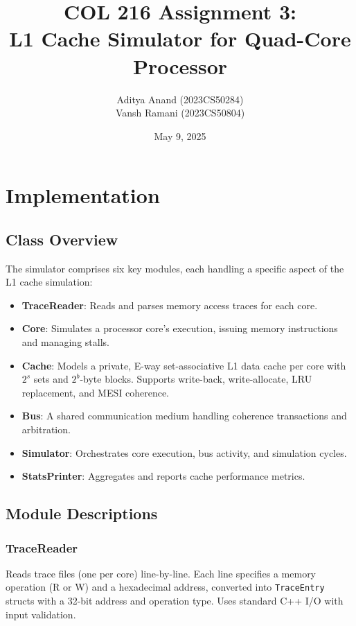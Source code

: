 \documentclass[11pt]{article}
\title{COL 216 Assignment 3: \\ L1 Cache Simulator for Quad-Core Processor}
\author{Aditya Anand (2023CS50284) \\ Vansh Ramani (2023CS50804)}
\date{May 9, 2025}
\begin{document}
\maketitle

\section{Implementation}

\subsection{Class Overview}
The simulator comprises six key modules, each handling a specific aspect of the L1 cache simulation:

\begin{itemize}
    \item \textbf{TraceReader}: Reads and parses memory access traces for each core.
    \item \textbf{Core}: Simulates a processor core’s execution, issuing memory instructions and managing stalls.
    \item \textbf{Cache}: Models a private, E-way set-associative L1 data cache per core with $2^s$ sets and $2^b$-byte blocks. Supports write-back, write-allocate, LRU replacement, and MESI coherence.
    \item \textbf{Bus}: A shared communication medium handling coherence transactions and arbitration.
    \item \textbf{Simulator}: Orchestrates core execution, bus activity, and simulation cycles.
    \item \textbf{StatsPrinter}: Aggregates and reports cache performance metrics.
\end{itemize}

\subsection{Module Descriptions}

\subsubsection{TraceReader}
Reads trace files (one per core) line-by-line. Each line specifies a memory operation (R or W) and a hexadecimal address, converted into \texttt{TraceEntry} structs with a 32-bit address and operation type. Uses standard C++ I/O with input validation.
\end{document}
